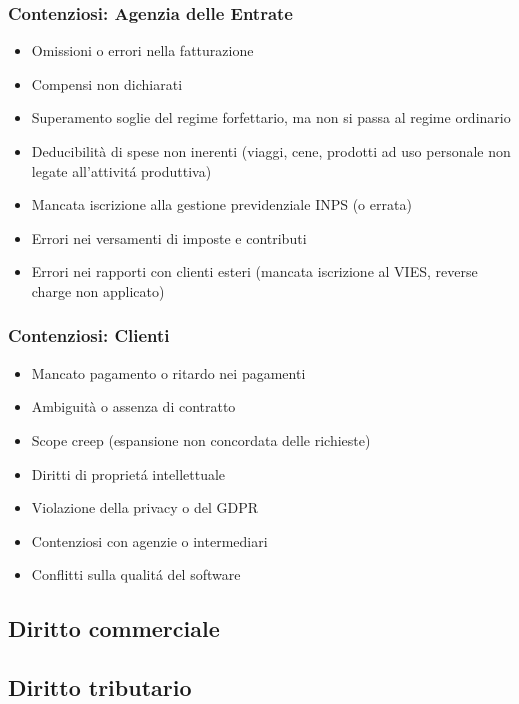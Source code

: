\documentclass{article}
\begin{document}
\subsubsection{Contenziosi: Agenzia delle Entrate}
\begin{itemize}
    \item Omissioni o errori nella fatturazione
    \item Compensi non dichiarati
    \item Superamento soglie del regime forfettario, ma non si passa al regime ordinario
    \item Deducibilità di spese non inerenti (viaggi, cene, prodotti ad uso personale non legate all'attivit\'a produttiva)
    \item Mancata iscrizione alla gestione previdenziale INPS (o errata)
    \item Errori nei versamenti di imposte e contributi
    \item Errori nei rapporti con clienti esteri (mancata iscrizione al VIES, reverse charge non applicato)
\end{itemize}

\subsubsection{Contenziosi: Clienti}
\begin{itemize}
    \item Mancato pagamento o ritardo nei pagamenti
    \item Ambiguità o assenza di contratto
    \item Scope creep (espansione non concordata delle richieste)
    \item Diritti di propriet\'a intellettuale
    \item Violazione della privacy o del GDPR
    \item Contenziosi con agenzie o intermediari
    \item Conflitti sulla qualit\'a del software
\end{itemize}

\subsection{Diritto commerciale}

\subsection{Diritto tributario}
\end{document}
